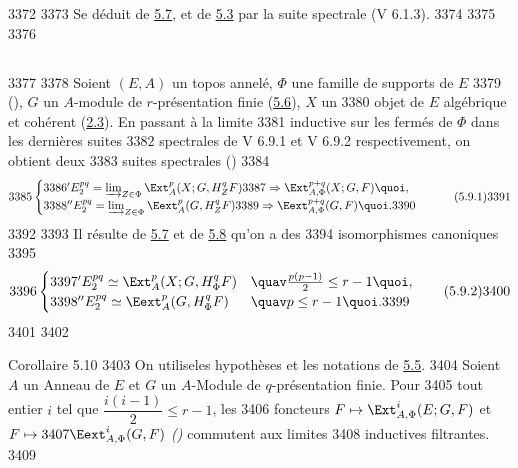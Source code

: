   3372	
  3373	Se déduit de \hyperref[VI.prop5.7]{5.7}, et de \hyperref[VI.cor5.3]{5.3} par la suite spectrale (V 6.1.3).
  3374	
  3375	\setcounter{subsection}{8}
  3376	\subsection{}
  3377	
  3378	Soient $(E, A)$ un topos annelé, $\Phi$ une famille de supports de $E$
  3379	(), $G$ un $A$-module de $r$-présentation finie (\hyperref[VI.def5.6]{5.6}), $X$ un
  3380	objet de $E$ algébrique et cohérent (\hyperref[VI.def2.3]{2.3}). En passant à la limite
  3381	inductive sur les fermés de $\Phi$ dans les dernières suites
  3382	spectrales de V 6.9.1 et V 6.9.2 respectivement, on obtient deux
  3383	suites spectrales ()
  3384	\begin{equation*}
  3385	\begin{cases}
  3386	'E^{pq}_2 = \varinjlim_{Z \in \Phi} \Ext^p_A (X; G, H^q_Z F)
  3387	\Rightarrow \Ext^{p+q}_{A, \Phi} (X; G, F){\quoi},\\
  3388	''E^{pq}_2 = \varinjlim_{Z \in \Phi} \Eext^p_A (G, H^q_Z F)
  3389	\Rightarrow \Eext^{p+q}_{A, \Phi} (G, F){\quoi}.
  3390	\end{cases}\tag{5.9.1}
  3391	\end{equation*}
  3392	
  3393	Il résulte de \hyperref[VI.prop5.7]{5.7} et de \hyperref[VI.cor5.8]{5.8} qu'on a des
  3394	isomorphismes canoniques
  3395	\begin{equation*}
  3396	\begin{cases}
  3397	'E^{pq}_2 \simeq \Ext^p_A (X; G, H^q_\Phi F)&\quav \frac{p(p-1)}{2} \leq r - 1{\quoi},\\
  3398	''E^{pq}_2 \simeq \Eext^p_A (G, H^q_\Phi F) &\quav p \leq r-1{\quoi}.
  3399	\end{cases}\tag{5.9.2}
  3400	\end{equation*}
  3401	
  3402	\begin{enonce*}{Corollaire 5.10}
  3403	On utilise\pageoriginale les hypothèses et les notations de \hyperref[VI.cor5.5]{5.5}.
  3404	Soient $A$ un Anneau de $E$ et $G$ un $A$-Module de $q$-présentation finie. Pour
  3405	tout entier $i$ tel que $\dfrac{i(i - 1)}{2} \leq r - 1$, les
  3406	foncteurs $F \mapsto \Ext^i_{A, \Phi} (E; G, F)$ et $F \mapsto
  3407	\Eext^i_{A, \Phi} (G, F)$ \emph{()} commutent aux limites
  3408	inductives filtrantes.
  3409	\end{enonce*}

